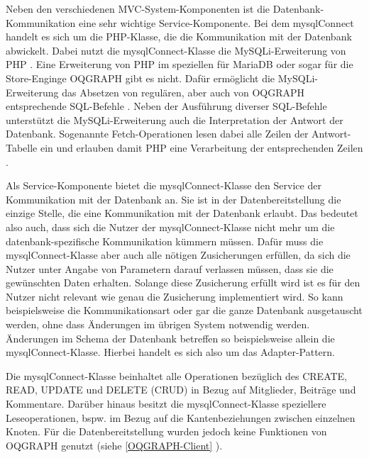 Neben den verschiedenen MVC-System-Komponenten ist die Datenbank-Kommunikation eine sehr wichtige Service-Komponente. Bei dem \grqq mysqlConnect\grqq{} handelt es sich um die PHP-Klasse, die die Kommunikation mit der Datenbank abwickelt. Dabei nutzt die mysqlConnect-Klasse die MySQLi-Erweiterung von PHP \cite{PHP-Mysqli}. Eine Erweiterung von PHP im speziellen für MariaDB oder sogar für die Store-Enginge OQGRAPH gibt es nicht. Dafür ermöglicht die MySQLi-Erweiterung das Absetzen von regulären, aber auch von OQGRAPH entsprechende SQL-Befehle \cite{PHP-Mysqli-Query}. Neben der Ausführung diverser SQL-Befehle unterstützt die MySQLi-Erweiterung auch die Interpretation der Antwort der Datenbank. Sogenannte Fetch-Operationen lesen dabei alle Zeilen der Antwort-Tabelle ein und erlauben damit PHP eine Verarbeitung der entsprechenden Zeilen \cite{PHP-Mysqli-Fetch}.

Als Service-Komponente bietet die mysqlConnect-Klasse den Service der Kommunikation mit der Datenbank an. Sie ist in der Datenbereitstellung die einzige Stelle, die eine Kommunikation mit der Datenbank erlaubt. Das bedeutet also auch, dass sich die Nutzer der mysqlConnect-Klasse nicht mehr um die datenbank-spezifische Kommunikation kümmern müssen. Dafür muss die mysqlConnect-Klasse aber auch alle nötigen Zusicherungen erfüllen, da sich die Nutzer unter Angabe von Parametern darauf verlassen müssen, dass sie die gewünschten Daten erhalten. Solange diese Zusicherung erfüllt wird ist es für den Nutzer nicht relevant wie genau die Zusicherung implementiert wird. So kann beispielsweise die Kommunikationsart oder gar die ganze Datenbank ausgetauscht werden, ohne dass Änderungen im übrigen System notwendig werden. Änderungen im Schema der Datenbank betreffen so beispielsweise allein die mysqlConnect-Klasse. Hierbei handelt es sich also um das Adapter-Pattern.

Die mysqlConnect-Klasse beinhaltet alle Operationen bezüglich des CREATE, READ, UPDATE und DELETE (CRUD) in Bezug auf Mitglieder, Beiträge und Kommentare. Darüber hinaus besitzt die mysqlConnect-Klasse speziellere Leseoperationen, bspw. im Bezug auf die Kantenbeziehungen zwischen einzelnen Knoten. Für die Datenbereitstellung wurden jedoch keine Funktionen von OQGRAPH genutzt (siehe \ref{OQGRAPH-Client} ).

